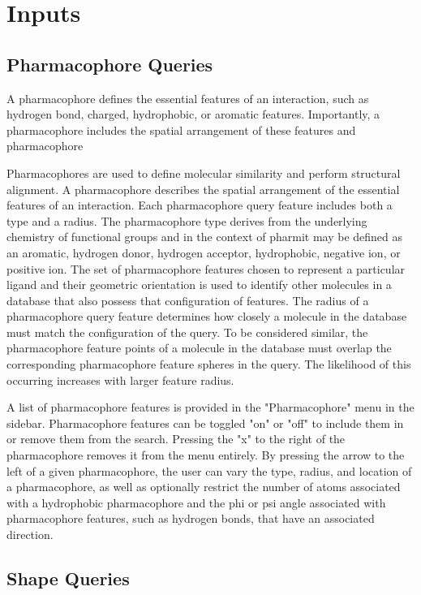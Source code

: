 \section{Inputs}

\subsection{Pharmacophore Queries}
A pharmacophore \cite{Koes_2015rev,Yang_2010,Leach_2010} defines the essential features of an interaction, such as hydrogen bond, charged, hydrophobic, or aromatic features. Importantly, a pharmacophore includes the spatial arrangement of these features and pharmacophore


Pharmacophores are used to define molecular similarity and perform structural alignment. A pharmacophore describes the spatial arrangement of the essential features of an interaction. Each pharmacophore query feature includes both a type and a radius. The pharmacophore type derives from the underlying chemistry of functional groups and in the context of pharmit may be defined as an aromatic, hydrogen donor, hydrogen acceptor, hydrophobic, negative ion, or positive ion. The set of pharmacophore features chosen to represent a particular ligand and their geometric orientation is used to identify other molecules in a database that also possess that configuration of features. The radius of a pharmacophore query feature determines how closely a molecule in the database must match the configuration of the query. To be considered similar, the pharmacophore feature points of a molecule in the database must overlap the corresponding pharmacophore feature spheres in the query. The likelihood of this occurring increases with larger feature radius.

A list of pharmacophore features is provided in the "Pharmacophore" menu in the sidebar. Pharmacophore features can be toggled "on" or "off" to include them in or remove them from the search. Pressing the "x" to the right of the pharmacophore removes it from the menu entirely. By pressing the arrow to the left of a given pharmacophore, the user can vary the type, radius, and location of a pharmacophore, as well as optionally restrict the number of atoms associated with a hydrophobic pharmacophore and the phi or psi angle associated with pharmacophore features, such as hydrogen bonds, that have an associated direction.


\subsection{Shape Queries}

